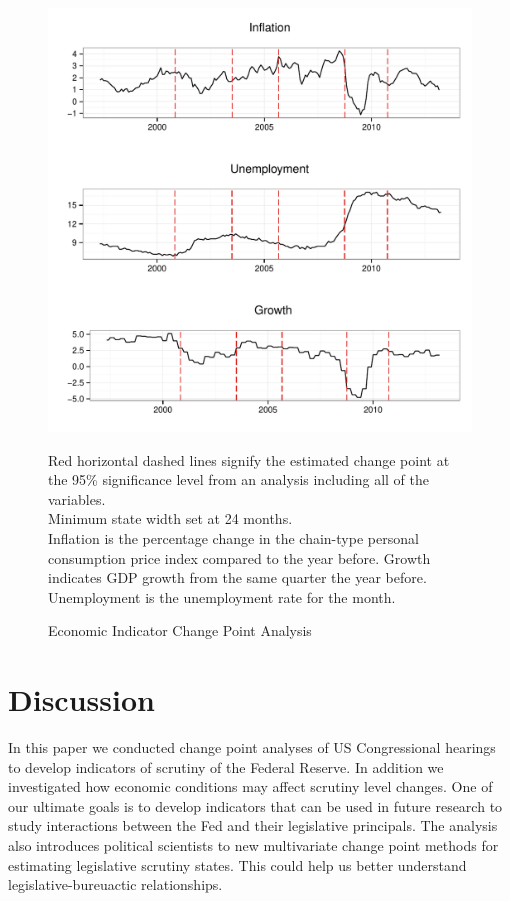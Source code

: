 \documentclass[a4paper]{article}\usepackage[]{graphicx}\usepackage[]{color}
\newenvironment{knitrout}{}{} %
\begin{document}
\begin{figure}
    \caption{Economic Indicator Change Point Analysis}
    \label{fig:FullEconCP}
\begin{knitrout}
\color{fgcolor}

{\centering \includegraphics[width=0.8\linewidth]{figure/EconFullCP} 

}



\end{knitrout}
{\scriptsize{Red horizontal dashed lines signify the estimated change point at the 95\% significance level from an analysis including all of the variables.\\
Minimum state width set at 24 months. \\
Inflation is the percentage change in the chain-type personal consumption price index compared to the year before. Growth indicates GDP growth from the same quarter the year before. Unemployment is the unemployment rate for the month.}}
\end{figure}


\section{Discussion}

In this paper we conducted change point analyses of US Congressional hearings to develop indicators of scrutiny of the Federal Reserve. In addition we investigated how economic conditions may affect scrutiny level changes. One of our ultimate goals is to develop indicators that can be used in future research to study interactions between the Fed and their legislative principals. The analysis also introduces political scientists to new multivariate change point methods for estimating legislative scrutiny states. This could help us better understand legislative-bureuactic relationships.
\end{document}

